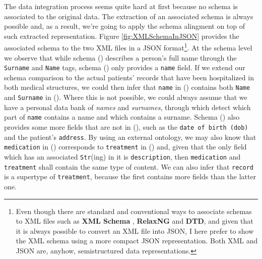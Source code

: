 The data integration process seems quite hard at first because no schema is associated to the original data. The extraction of an associated schema  is always possible \cite{BaaziziLCGS17} and, as a result, we're going to apply the schema alingment on top of such extracted representation. Figure \vref{fig:XMLSchemaInJSON} provides the associated schema to the two XML files in a JSON format\footnote{Even though there are standard and conventional ways to associate schemas to XML files such as \textbf{XML Schema} \cite{VlistXS}, \textbf{RelaxNG} and \textbf{DTD}, and given that it is always possible to convert an XML file into JSON, I here prefer to show the XML schema using a more compact JSON representation. Both XML and JSON are, anyhow, semistructured data representations.}. At the schema level we observe that while schema () describes a person's full name through the \texttt{Surname} and \texttt{Name} tags,  schema () only provides a \texttt{name} field. If we extend our schema comparison to the actual patients' records that have been hospitalized in both medical structures, we could then infer that \texttt{name} in () contains both \texttt{Name} and \texttt{Surname} in (). Where this is not possible, we could always assume that we have a personal data bank of \textit{names} and \textit{surnames}, through which detect which part of \texttt{name} contains a name and which contains a surname. Schema () also provides some more fields that are not in (), such as the \texttt{date of birth (dob)} and the patient's \texttt{address}. By using an external ontology, we may also know that \texttt{medication} in () corresponds to \texttt{treatment} in () and, given that the only field which has an associated  \texttt{Str}(ing) in it is \texttt{description}, then \texttt{medication} and \texttt{treatment} shall contain the same type of content. We can also infer that \texttt{record} is a supertype of \texttt{treatment}, because the first contains more fields than the latter one.


